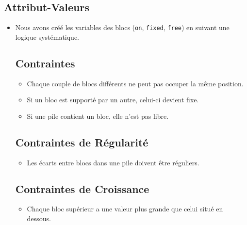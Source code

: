\documentclass[12pt]{article}
\begin{document}
            \subsection{Attribut-Valeurs}
                \begin{itemize}
                    \item Nous avons créé les variables des blocs (\texttt{on}, \texttt{fixed}, \texttt{free}) en suivant une logique systématique.
            \subsection{Contraintes}
                \begin{itemize}
                    \item Chaque couple de blocs différents ne peut pas occuper la même position.
                    \item Si un bloc est supporté par un autre, celui-ci devient fixe.
                    \item Si une pile contient un bloc, elle n’est pas libre.
                \end{itemize}
           \subsection{Contraintes de Régularité}
                \begin{itemize}
                    \item Les écarts entre blocs dans une pile doivent être réguliers.
                \end{itemize}
            \subsection{Contraintes de Croissance}
                \begin{itemize}
                    \item Chaque bloc supérieur a une valeur plus grande que celui situé en dessous.
                \end{itemize}
            

\end{itemize}
\end{document}
